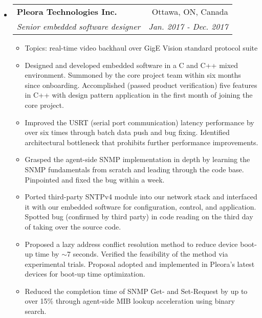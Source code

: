 \documentclass[letterpaper,11pt]{article}
\makeatletter
\newcommand{\ressubheading}[4]{
\begin{tabular*}{6.69in}{l@{\extracolsep{\fill}}r}
        \textbf{#1} & #2 \\
        \textit{#3} & \textit{#4} \\
\end{tabular*}\vspace{-6pt}
}
\newcommand{\resitem}[1]{\item #1 \vspace{-2pt}}
\makeatother
\begin{document}
\begin{itemize}
\item
  \ressubheading{Pleora Technologies Inc.}{Ottawa, ON, Canada}
  {Senior embedded software designer}{Jan. 2017 - Dec. 2017}
  \begin{itemize}
    \resitem{Topics: real-time video backhaul over GigE Vision standard protocol suite}
    \resitem{Designed and developed embedded software in a C and C++ mixed environment. Summoned by the core project team within six months since onboarding.
    Accomplished (passed product verification) five features in C++ with design pattern application in the first month of joining the core project.}
    \resitem{Improved the USRT (serial port communication) latency performance by over six times through batch data push and bug fixing.
    Identified architectural bottleneck that prohibits further performance improvements.}
    \resitem{Grasped the agent-side SNMP implementation in depth by learning the SNMP fundamentals from scratch
    and leading through the code base. Pinpointed and fixed the bug within a week.}
    \resitem{Ported third-party SNTPv4 module into our network stack and interfaced it with our embedded software for configuration, control, and application.
    Spotted bug (confirmed by third party) in code reading on the third day of taking over the source code.}
    \resitem{Proposed a lazy address conflict resolution method to reduce device boot-up time by $\sim$7 seconds.
    Verified the feasibility of the method via experimental trials.
    Proposal adopted and implemented in Pleora's latest devices for boot-up time optimization.}
    \resitem{Reduced the completion time of SNMP Get- and Set-Request by up to over 15\% through agent-side MIB lookup acceleration using binary search.}
  \end{itemize}


\end{itemize}
\end{document}

